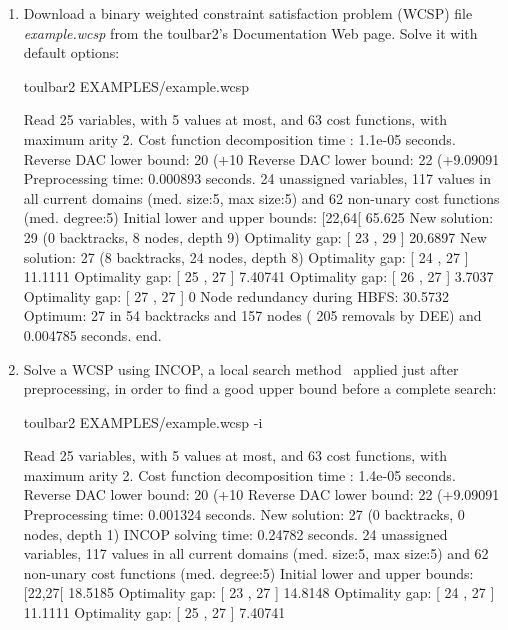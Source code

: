 \begin{enumerate}
\item Download a binary weighted constraint satisfaction problem (WCSP) file {\em example.wcsp} from the toulbar2's Documentation Web page. Solve it with default options:
\begin{DoxyCode}
	toulbar2 EXAMPLES/example.wcsp
\end{DoxyCode}
{\scriptsize
\begin{DoxyCode}
Read 25 variables, with 5 values at most, and 63 cost functions, with maximum arity 2.
Cost function decomposition time : 1.1e-05 seconds.
Reverse DAC lower bound: 20 (+10%
Reverse DAC lower bound: 22 (+9.09091%
Preprocessing time: 0.000893 seconds.
24 unassigned variables, 117 values in all current domains (med. size:5, max size:5) and 62 non-unary cost functions (med. degree:5)
Initial lower and upper bounds: [22,64[ 65.625%
New solution: 29 (0 backtracks, 8 nodes, depth 9)
Optimality gap: [ 23 , 29 ] 20.6897 %
New solution: 27 (8 backtracks, 24 nodes, depth 8)
Optimality gap: [ 24 , 27 ] 11.1111 %
Optimality gap: [ 25 , 27 ] 7.40741 %
Optimality gap: [ 26 , 27 ] 3.7037 %
Optimality gap: [ 27 , 27 ] 0 %
Node redundancy during HBFS: 30.5732 %
Optimum: 27 in 54 backtracks and 157 nodes ( 205 removals by DEE) and 0.004785 seconds.
end.
\end{DoxyCode}}
\item Solve a WCSP using INCOP, a local search method~\cite{idwalk:cp04} applied just after preprocessing, in order to find a good upper bound before a complete search:
\begin{DoxyCode}
	toulbar2 EXAMPLES/example.wcsp -i
\end{DoxyCode}
{\scriptsize
\begin{DoxyCode}
Read 25 variables, with 5 values at most, and 63 cost functions, with maximum arity 2.
Cost function decomposition time : 1.4e-05 seconds.
Reverse DAC lower bound: 20 (+10%
Reverse DAC lower bound: 22 (+9.09091%
Preprocessing time: 0.001324 seconds.
New solution: 27 (0 backtracks, 0 nodes, depth 1)
INCOP solving time: 0.24782 seconds.
24 unassigned variables, 117 values in all current domains (med. size:5, max size:5) and 62 non-unary cost functions (med. degree:5)
Initial lower and upper bounds: [22,27[ 18.5185%
Optimality gap: [ 23 , 27 ] 14.8148 %
Optimality gap: [ 24 , 27 ] 11.1111 %
Optimality gap: [ 25 , 27 ] 7.40741 %

\end{DoxyCode}}
\end{enumerate}
